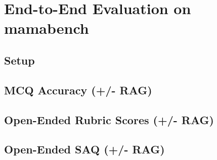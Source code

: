 \section{End-to-End Evaluation on mamabench}
\label{sec:endtoend}


\subsection{Setup}

\subsection{MCQ Accuracy (+/- RAG)}

\subsection{Open-Ended Rubric Scores (+/- RAG)}

\subsection{Open-Ended SAQ (+/- RAG)}

